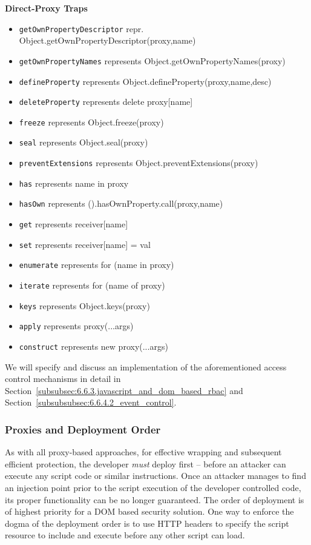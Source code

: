 \textbf{Direct-Proxy Traps}
\begin{itemize}
 \item \texttt{getOwnPropertyDescriptor} repr. Object.getOwnPropertyDescriptor(proxy,name)
  \item \texttt{getOwnPropertyNames} represents Object.getOwnPropertyNames(proxy) 
  \item \texttt{defineProperty} represents Object.defineProperty(proxy,name,desc)
  \item \texttt{deleteProperty} represents delete proxy[name]
  \item \texttt{freeze} represents Object.freeze(proxy)
  \item \texttt{seal} represents Object.seal(proxy)
  \item \texttt{preventExtensions} represents Object.preventExtensions(proxy)
  \item \texttt{has} represents name in proxy
  \item \texttt{hasOwn} represents ({}).hasOwnProperty.call(proxy,name)
  \item \texttt{get} represents receiver[name]
  \item \texttt{set} represents receiver[name] = val
  \item \texttt{enumerate} represents for (name in proxy)
  \item \texttt{iterate} represents for (name of proxy)
  \item \texttt{keys} represents Object.keys(proxy)
  \item \texttt{apply} represents proxy(...args)
  \item \texttt{construct} represents new proxy(...args)
\end{itemize}

      We will specify and discuss an implementation of the aforementioned access control mechanisms in detail in Section~\ref{subsubsec:6.6.3.javascript_and_dom_based_rbac} and Section~\ref{subsubsubsec:6.6.4.2_event_control}. 

      \subsubsection{Proxies and Deployment Order}
      \label{subsubsec:6.4.2.proxies_and_deployment_order}

      As with all proxy-based approaches, for effective wrapping and subsequent efficient protection, the developer \textit{must} deploy first -- before an attacker can execute any script code or similar instructions. Once an attacker manages to find an injection point prior to the script execution of the developer controlled code, its proper functionality can be no longer guaranteed. The order of deployment is of highest priority for a DOM based security solution. One way to enforce the dogma of the deployment order is to use HTTP headers to specify the script resource to include and execute before any other script can load.

